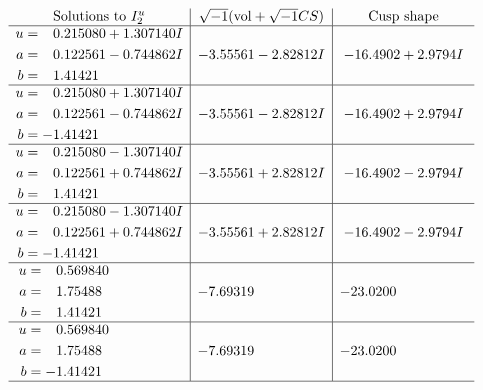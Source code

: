 \documentclass[1p]{elsarticle_modified}
\theoremstyle{definition}
\newcommand{\I}{\sqrt{-1}}
\begin{document}
$$\begin{array}{c|c|c}  
\text{Solutions to }I^u_{2}& \I (\text{vol} + \sqrt{-1}CS) & \text{Cusp shape}\\
 \hline 
\begin{aligned}
u &= \phantom{-}0.215080 + 1.307140 I \\
a &= \phantom{-}0.122561 - 0.744862 I \\
b &= \phantom{-}1.41421\phantom{ +0.000000I}\end{aligned}
 & -3.55561 - 2.82812 I & -16.4902 + 2.9794 I \\ \hline\begin{aligned}
u &= \phantom{-}0.215080 + 1.307140 I \\
a &= \phantom{-}0.122561 - 0.744862 I \\
b &= -1.41421\phantom{ +0.000000I}\end{aligned}
 & -3.55561 - 2.82812 I & -16.4902 + 2.9794 I \\ \hline\begin{aligned}
u &= \phantom{-}0.215080 - 1.307140 I \\
a &= \phantom{-}0.122561 + 0.744862 I \\
b &= \phantom{-}1.41421\phantom{ +0.000000I}\end{aligned}
 & -3.55561 + 2.82812 I & -16.4902 - 2.9794 I \\ \hline\begin{aligned}
u &= \phantom{-}0.215080 - 1.307140 I \\
a &= \phantom{-}0.122561 + 0.744862 I \\
b &= -1.41421\phantom{ +0.000000I}\end{aligned}
 & -3.55561 + 2.82812 I & -16.4902 - 2.9794 I \\ \hline\begin{aligned}
u &= \phantom{-}0.569840\phantom{ +0.000000I} \\
a &= \phantom{-}1.75488\phantom{ +0.000000I} \\
b &= \phantom{-}1.41421\phantom{ +0.000000I}\end{aligned}
 & -7.69319\phantom{ +0.000000I} & -23.0200\phantom{ +0.000000I} \\ \hline\begin{aligned}
u &= \phantom{-}0.569840\phantom{ +0.000000I} \\
a &= \phantom{-}1.75488\phantom{ +0.000000I} \\
b &= -1.41421\phantom{ +0.000000I}\end{aligned}
 & -7.69319\phantom{ +0.000000I} & -23.0200\phantom{ +0.000000I}\\
 \hline 
 \end{array}$$\newpage\newpage\renewcommand{\arraystretch}{1}
\end{document}
